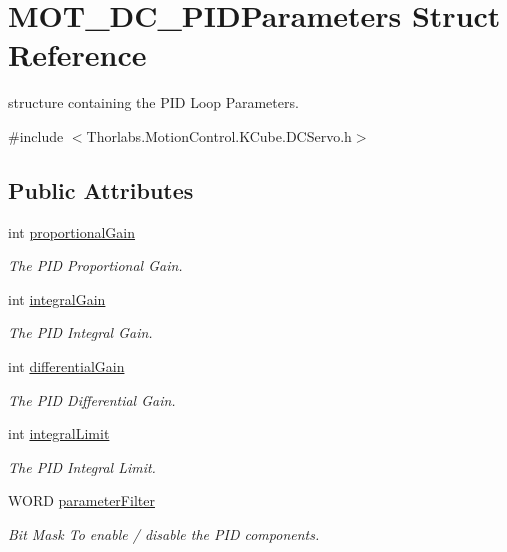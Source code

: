 \hypertarget{struct_m_o_t___d_c___p_i_d_parameters}{}\section{M\+O\+T\+\_\+\+D\+C\+\_\+\+P\+I\+D\+Parameters Struct Reference}
\label{struct_m_o_t___d_c___p_i_d_parameters}


structure containing the P\+ID Loop Parameters.  




{\ttfamily \#include $<$Thorlabs.\+Motion\+Control.\+K\+Cube.\+D\+C\+Servo.\+h$>$}

\subsection*{Public Attributes}
\begin{DoxyCompactItemize}
\item 
int \hyperlink{struct_m_o_t___d_c___p_i_d_parameters_a451cab59cf2180122335beb88549e867}{proportional\+Gain}
\begin{DoxyCompactList}\small\item\em The P\+ID Proportional Gain. \end{DoxyCompactList}\item 
int \hyperlink{struct_m_o_t___d_c___p_i_d_parameters_aa6c6c1c529672889ed288bf9ee9219c5}{integral\+Gain}
\begin{DoxyCompactList}\small\item\em The P\+ID Integral Gain. \end{DoxyCompactList}\item 
int \hyperlink{struct_m_o_t___d_c___p_i_d_parameters_ad66ecfc0d02a8192860814496e1b60d7}{differential\+Gain}
\begin{DoxyCompactList}\small\item\em The P\+ID Differential Gain. \end{DoxyCompactList}\item 
int \hyperlink{struct_m_o_t___d_c___p_i_d_parameters_a72ad0a8a97974309738cc07a0782e99d}{integral\+Limit}
\begin{DoxyCompactList}\small\item\em The P\+ID Integral Limit. \end{DoxyCompactList}\item 
W\+O\+RD \hyperlink{struct_m_o_t___d_c___p_i_d_parameters_a60c568a8d192dd2577b285d8f0bd76d5}{parameter\+Filter}
\begin{DoxyCompactList}\small\item\em Bit Mask To enable / disable the P\+ID components. \end{DoxyCompactList}\end{DoxyCompactItemize}


